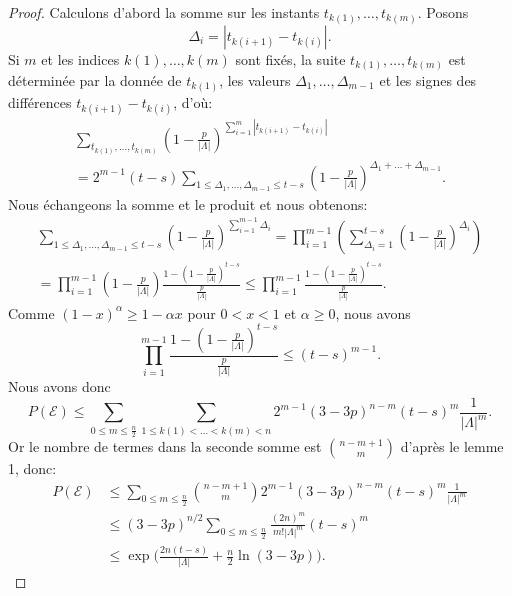\documentclass[titlepage,a4paper,12pt]{article}
\newcounter{d}
\newcounter{t}
\newcounter{p}
\newcounter{c}
\newcounter{a}
\newcounter{l}
\begin{document}
\begin{proof}
Calculons d'abord la somme sur les instants $t_{k(1)},\dots,t_{k(m)}$. Posons $$\Delta_i = |t_{k(i+1)}-t_{k(i)}|.$$ Si $m$ et les indices $k(1),\dots,k(m)$ sont fixés, la suite $t_{k(1)},\dots,t_{k(m)}$ est déterminée par la donnée de $t_{k(1)}$, les valeurs $\Delta_1,\dots,\Delta_{m-1}$ et les signes des différences $t_{k(i+1)}-t_{k(i)}$, d'où:
\begin{multline*}\sum_{t_{k(1)},\dots,t_{k(m)}}(1-\frac{p}{|\Lambda|})^{\displaystyle\sum_{i=1}^{m}|t_{k(i+1)}-t_{k(i)}|} \\ = 2^{m-1}(t-s)\sum_{1\leqslant\Delta_1,\dots,\Delta_{m-1}\leqslant t-s}(1-\frac{p}{|\Lambda|})^{\Delta_1+\dots+\Delta_{m-1}}.
\end{multline*}
Nous échangeons la somme et le produit et nous obtenons:
\begin{multline*}\sum_{1\leqslant\Delta_1,\dots,\Delta_{m-1}\leqslant t-s}(1-\frac{p}{|\Lambda|})^{\sum_{i=1}^{m-1}\Delta_i} = \prod_{i=1}^{m-1}\left(\sum_{\Delta_i = 1}^{t-s}\left(1-\frac{p}{|\Lambda|}\right)^{\Delta_i}\right)\\= \prod_{i=1}^{m-1}\left(1-\frac{p}{|\Lambda|}\right)\frac{\displaystyle1-(1-\frac{p}{|\Lambda|})^{t-s}}{\displaystyle\frac{p}{|\Lambda|}}\leqslant \prod_{i=1}^{m-1}\frac{\displaystyle1-(1-\frac{p}{|\Lambda|})^{t-s}}{\displaystyle\frac{p}{|\Lambda|}}.
\end{multline*}
Comme $(1-x)^\alpha \geqslant 1-\alpha x$ pour $0<x<1$ et $\alpha\geqslant 0$, nous avons 
$$ \prod_{i=1}^{m-1}\frac{\displaystyle 1-(1-\frac{p}{|\Lambda|})^{t-s}}{\displaystyle\frac{p}{|\Lambda|}} \leqslant(t-s)^{m-1}.
$$
Nous avons donc
$$P(\mathcal{E}) \leqslant\sum_{0\leqslant m \leqslant \frac{n}{2}}\sum_{1\leqslant k(1)<\dots<k(m)<n} 2^{m-1}(3-3p)^{n-m}(t-s)^m\frac{1}{|\Lambda|^m}.
$$
Or le nombre de termes dans la seconde somme est $\binom{n-m+1}{m}$ d'après le lemme 1, donc:
\begin{align*}P\left(\mathcal{E}\right)& \leqslant\sum_{0\leqslant m \leqslant\frac{n}{2}}\binom{n-m+1}{m} 2^{m-1}(3-3p)^{n-m}(t-s)^m\frac{1}{|\Lambda|^m}\\
& \leqslant (3-3p)^{n/2}\sum_{0\leqslant m \leqslant\frac{n}{2}}\frac{(2n)^m}{m!|\Lambda|^m}(t-s)^m \\
&\leqslant \exp\big(\frac{2n(t-s)}{|\Lambda|}+\frac{n}{2}\ln(3-3p)\big).
\end{align*}
\end{proof}
\end{document}

